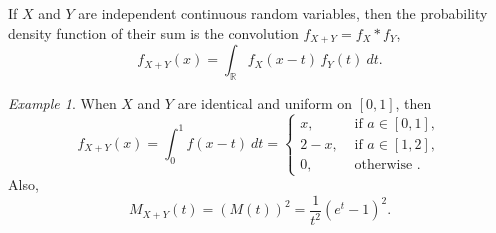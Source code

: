 \documentclass[11pt]{article}
\def\R{\mathbb{R}}
\theoremstyle{definition}
\theoremstyle{remark}
\newtheorem*{example}{Example}
\numberwithin{equation}{module}
\begin{document}
    \begin{theorem}
        If $X$ and $Y$ are independent continuous random variables, then the
        probability density function of their sum is the convolution $f_{X + Y} =
        f_X * f_Y$, \[
            f_{X + Y}(x) = \int_{\R} f_X(x - t)\,f_Y(t)\:dt.
        \] 
    \end{theorem}
    \begin{example}
        When $X$ and $Y$ are identical and uniform on $[0, 1]$, then \[
            f_{X + Y}(x) = \int_0^1 f(x - t) \:dt = \begin{cases}
                x, &\text{ if }a\in [0, 1], \\
                2 - x, &\text{ if }a\in [1, 2], \\
                0, &\text{ otherwise }.
            \end{cases}
        \] Also, \[
            M_{X + Y}(t) = (M(t))^2 = \frac{1}{t^2}(e^t - 1)^2.
        \] 
    \end{example}
\end{document}
